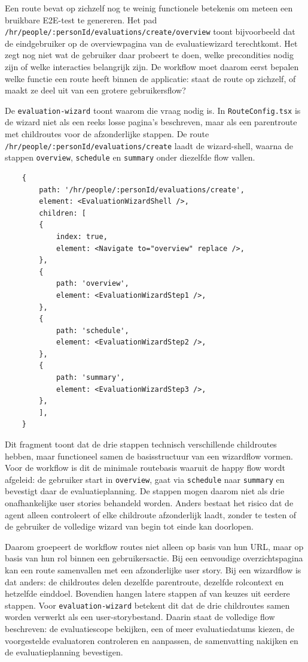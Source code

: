 Een route bevat op zichzelf nog te weinig functionele betekenis om meteen een bruikbare E2E-test te genereren. Het pad \texttt{/hr/people/:personId/evaluations/create/overview} toont bijvoorbeeld dat de eindgebruiker op de overviewpagina van de evaluatiewizard terechtkomt. Het zegt nog niet wat de gebruiker daar probeert te doen, welke precondities nodig zijn of welke interacties belangrijk zijn. De workflow moet daarom eerst bepalen welke functie een route heeft binnen de applicatie: staat de route op zichzelf, of maakt ze deel uit van een grotere gebruikersflow?

De \texttt{evaluation-wizard} toont waarom die vraag nodig is. In \texttt{RouteConfig.tsx} is de wizard niet als een reeks losse pagina's beschreven, maar als een parentroute met childroutes voor de afzonderlijke stappen. De route \texttt{/hr/people/:personId/evaluations/create} laadt de wizard-shell, waarna de stappen \texttt{overview}, \texttt{schedule} en \texttt{summary} onder diezelfde flow vallen.

\begin{verbatim}
    {
        path: '/hr/people/:personId/evaluations/create',
        element: <EvaluationWizardShell />,
        children: [
        {
            index: true,
            element: <Navigate to="overview" replace />,
        },
        {
            path: 'overview',
            element: <EvaluationWizardStep1 />,
        },
        {
            path: 'schedule',
            element: <EvaluationWizardStep2 />,
        },
        {
            path: 'summary',
            element: <EvaluationWizardStep3 />,
        },
        ],
    }
\end{verbatim}

Dit fragment toont dat de drie stappen technisch verschillende childroutes hebben, maar functioneel samen de basisstructuur van een wizardflow vormen. Voor de workflow is dit de minimale routebasis waaruit de happy flow wordt afgeleid: de gebruiker start in \texttt{overview}, gaat via \texttt{schedule} naar \texttt{summary} en bevestigt daar de evaluatieplanning. De stappen mogen daarom niet als drie onafhankelijke user stories behandeld worden. Anders bestaat het risico dat de agent alleen controleert of elke childroute afzonderlijk laadt, zonder te testen of de gebruiker de volledige wizard van begin tot einde kan doorlopen.

Daarom groepeert de workflow routes niet alleen op basis van hun URL, maar op basis van hun rol binnen een gebruikersactie. Bij een eenvoudige overzichtspagina kan een route samenvallen met een afzonderlijke user story. Bij een wizardflow is dat anders: de childroutes delen dezelfde parentroute, dezelfde rolcontext en hetzelfde einddoel. Bovendien hangen latere stappen af van keuzes uit eerdere stappen. Voor \texttt{evaluation-wizard} betekent dit dat de drie childroutes samen worden verwerkt als een user-storybestand. Daarin staat de volledige flow beschreven: de evaluatiescope bekijken, een of meer evaluatiedatums kiezen, de voorgestelde evaluatoren controleren en aanpassen, de samenvatting nakijken en de evaluatieplanning bevestigen.

